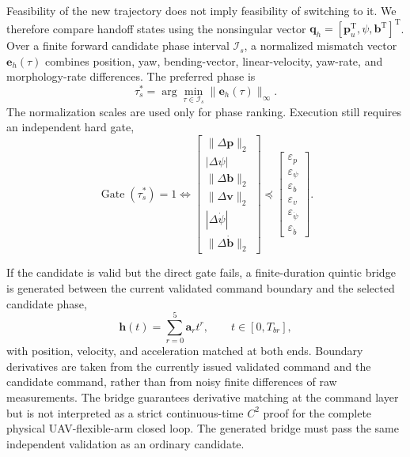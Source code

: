 \documentclass[journal,twoside]{IEEEtran}
\begin{document}
Feasibility of the new trajectory does not imply feasibility of switching to it. We therefore compare handoff states using the nonsingular vector $\mathbf q_h=[\mathbf p_u^{\mathrm T},\psi,\mathbf b^{\mathrm T}]^{\mathrm T}$. Over a finite forward candidate phase interval $\mathcal I_s$, a normalized mismatch vector $\mathbf e_h(\tau)$ combines position, yaw, bending-vector, linear-velocity, yaw-rate, and morphology-rate differences. The preferred phase is
\begin{equation}
\tau_s^*=\arg\min_{\tau\in\mathcal I_s}\|\mathbf e_h(\tau)\|_\infty.
\label{eq:phase_match}
\end{equation}
The normalization scales are used only for phase ranking. Execution still requires an independent hard gate,
\begin{equation}
\operatorname{Gate}(\tau_s^*)=1
\iff
\begin{bmatrix}
\|\Delta\mathbf p\|_2\\|\Delta\psi|\\\|\Delta\mathbf b\|_2\\
\|\Delta\mathbf v\|_2\\|\Delta\dot\psi|\\\|\Delta\dot{\mathbf b}\|_2
\end{bmatrix}
\preceq
\begin{bmatrix}
\varepsilon_p\\\varepsilon_\psi\\\varepsilon_b\\
\varepsilon_v\\\varepsilon_{\dot\psi}\\\varepsilon_{\dot b}
\end{bmatrix}.
\label{eq:handoff_gate}
\end{equation}

If the candidate is valid but the direct gate fails, a finite-duration quintic bridge is generated between the current validated command boundary and the selected candidate phase,
\begin{equation}
\mathbf h(t)=\sum_{r=0}^{5}\mathbf a_rt^r,
\qquad t\in[0,T_{br}],
\label{eq:quintic_bridge}
\end{equation}
with position, velocity, and acceleration matched at both ends. Boundary derivatives are taken from the currently issued validated command and the candidate command, rather than from noisy finite differences of raw measurements. The bridge guarantees derivative matching at the command layer but is not interpreted as a strict continuous-time $C^2$ proof for the complete physical UAV-flexible-arm closed loop. The generated bridge must pass the same independent validation as an ordinary candidate.
\end{document}
